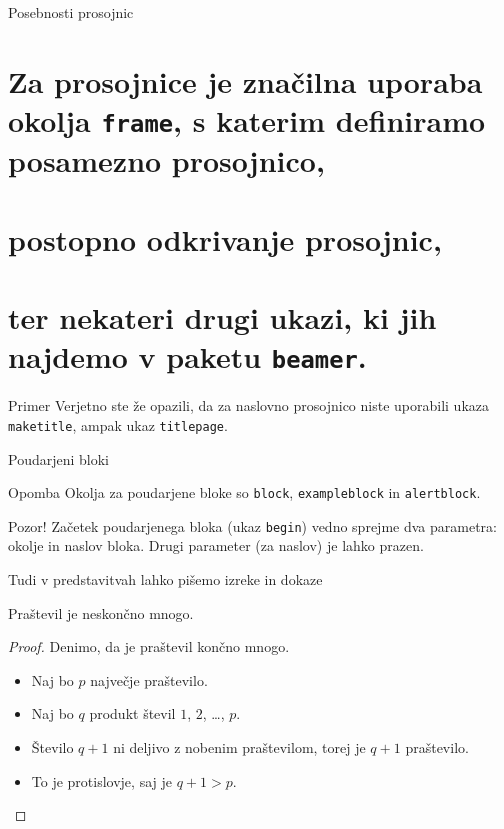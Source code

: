 \begin{frame}{Posebnosti prosojnic}
	    \section{Za prosojnice je značilna uporaba okolja \texttt{frame},
	    s katerim definiramo posamezno prosojnico,} \pause
	    \section{postopno odkrivanje prosojnic,} \pause
	    \section{ter nekateri drugi ukazi, ki jih najdemo v paketu \texttt{beamer}.} \pause
	\begin{exampleblock}{Primer}
		Verjetno ste že opazili, da za naslovno prosojnico niste uporabili
		ukaza \texttt{maketitle}, ampak ukaz \texttt{titlepage}.
	\end{exampleblock}	
\end{frame}


\begin{frame}{Poudarjeni bloki}

	\begin{block}{Opomba}
		Okolja za poudarjene bloke so \texttt{block}, \texttt{exampleblock} in \texttt{alertblock}.
	\end{block}	
	    
    \begin{alertblock}{Pozor!}
		Začetek poudarjenega bloka (ukaz \texttt{begin}) vedno sprejme 
		dva parametra: okolje in naslov bloka.
		Drugi parameter (za naslov) je lahko prazen. 
	\end{alertblock}
		
\end{frame}


\begin{frame}{Tudi v predstavitvah lahko pišemo izreke in dokaze}

	\begin{izrek}
	   Praštevil je neskončno mnogo.
	\end{izrek}

	\begin{proof}
	   Denimo, da je praštevil končno mnogo.
	   	
	   \begin{itemize}[<+->]
		  \item Naj bo $p$ \alert<4>{največje} praštevilo.
		  \item Naj bo $q$ produkt števil $1$, $2$, \ldots, $p$.
		  \item Število $q+1$ ni deljivo z nobenim praštevilom, torej je $q+1$ praštevilo.
		  \item To je protislovje, saj je $q+1>p$. \qedhere
	   \end{itemize}

	\end{proof}

 \end{frame}
 
